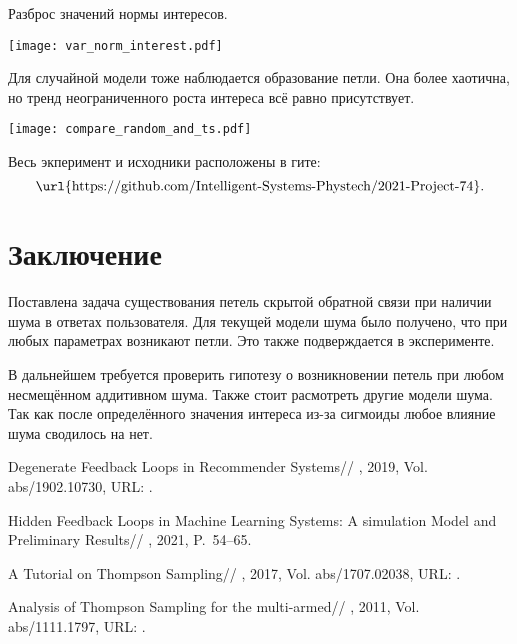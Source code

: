 \documentclass[12pt, twoside]{article}
\begin{document}
Разброс значений нормы интересов. 
\begin{center}
  \texttt{[image: var\_norm\_interest.pdf]}
\end{center}

Для случайной модели тоже наблюдается образование петли. 
Она более хаотична, но тренд неограниченного роста интереса всё равно присутствует.   
\begin{center}
  \texttt{[image: compare\_random\_and\_ts.pdf]}
\end{center}


\begin{figure}[ht]
\end{figure}

Весь экперимент и исходники расположены в гите: 
\[  \text{\url{https://github.com/Intelligent-Systems-Phystech/2021-Project-74}}. \]

\section{Заключение}
Поставлена задача существования петель скрытой обратной связи при наличии шума в ответах пользователя. 
Для текущей модели шума было получено, что при любых параметрах возникают петли. 
Это также подверждается в эксперименте.

В дальнейшем требуется проверить гипотезу о возникновении петель при любом несмещённом аддитивном шума. 
Также стоит расмотреть другие модели шума. 
Так как после определённого значения интереса из-за сигмоиды любое влияние шума сводилось на нет. 
\begin{thebibliography}{99}
    Degenerate Feedback Loops in Recommender Systems//
    , 2019, Vol. abs/1902.10730,
	  URL: .

    Hidden Feedback Loops in Machine Learning Systems: A simulation Model and Preliminary Results//
    , 2021, P.~54--65.

    A Tutorial on Thompson Sampling//
    , 2017, Vol. abs/1707.02038,
	  URL: .

    Analysis of Thompson Sampling for the multi-armed//
    , 2011, Vol. abs/1111.1797,
	  URL: .
\end{thebibliography}

\end{document}

